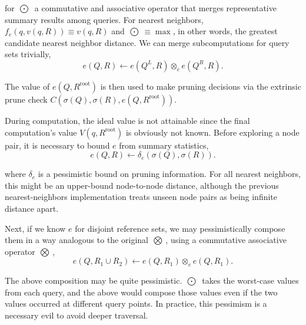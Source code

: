 \documentclass[twoside,leqno,twocolumn]{article}
\newcommand{\authornote}[1]{\footnote{Note to self: #1}}
\newcommand{\union}{\cup}
\newcommand{\summary}{\delta}
\newcommand{\kdroot}[1]{#1^{\text{root}}}
\newcommand{\kdleft}[1]{#1^{\!L}}
\newcommand{\kdright}[1]{#1^{\!R}}
\newcommand{\nameOp}[2]{\mathop{#1\nolimits\!\!_{#2}}}
\newcommand{\nameop}[2]{#1_{\!#2}}
\newcommand{\myOp}[1]{\nameOp{\bigotimes}{#1}}
\newcommand{\myop}[1]{\nameop{\otimes}{#1}}
\newcommand{\letterqr}{v}
\newcommand{\outqr}{V}
\newcommand{\inqr}{v}
\newcommand{\Opqr}{\myOp{\letterqr}}
\newcommand{\lettermu}{e}
\newcommand{\inmu}{e}
\newcommand{\Outopmu}{\nameOp{\bigodot}{\lettermu}}%
\newcommand{\outopmu}{\myop{\lettermu}}
\newcommand{\Opmu}{\myOp{\lettermu}}
\newcommand{\opmu}{\myop{\lettermu}}
\newcommand{\fmu}{f_{\lettermu}}
\newcommand{\deltamu}{\summary_{\lettermu}}
\newcommand{\canprunemu}{C}
\newcommand{\outstat}{\sigma}
\begin{document}
\noindent for $\Outopmu$ a commutative and associative operator that merges representative summary results among queries.
For nearest neighbors, $\fmu(q, \inqr(q, R)) \equiv \inqr(q, R)$ and $\Outopmu \equiv \max$, in other words, the greatest candidate nearest neighbor distance.
We can merge subcomputations for query sets trivially,
\begin{equation}
\inmu(Q, R) \gets \inmu(\kdleft{Q}, R) \outopmu \inmu(\kdright{Q}, R).
\label{eqn:muchild}
\end{equation}

\noindent
The value of $\inmu(Q, \kdroot{R})$ is then used to make pruning decisions via the extrinsic prune check $\canprunemu(\outstat(Q), \outstat(R), \inmu(Q, \kdroot{R}))$.

During computation, the ideal value is not attainable since the final computation's value $\outqr(q, \kdroot{R})$ is obviously not known.
Before exploring a node pair, it is necessary to bound $\inmu$ from summary statistics,
\begin{equation}
\inmu(Q, R) \gets \deltamu(\outstat(Q), \outstat(R)).
\label{eqn:mudelta}
\end{equation}

\noindent
where $\deltamu$ is a pessimistic bound on pruning information.
For all nearest neighbors, this might be an upper-bound node-to-node distance, although the previous nearest-neighbors implementation treats unseen node pairs as being infinite distance apart.

Next, if we know $\inmu$ for disjoint reference sets, we may pessimistically compose them in a way analogous to the original $\Opqr$, using a commutative associative operator $\Opmu$,
\begin{equation}
\inmu(Q, R_1 \union R_2) \gets \inmu(Q, R_1) \opmu \inmu(Q, R_1).
\label{eqn:mucompose}
\end{equation}

\noindent
The above composition may be quite pessimistic.
$\Outopmu$ takes the worst-case values from each query, and the above would compose those values even if the two values occurred at different query points.
In practice, this pessimism is a necessary evil to avoid deeper traversal.
\end{document}
